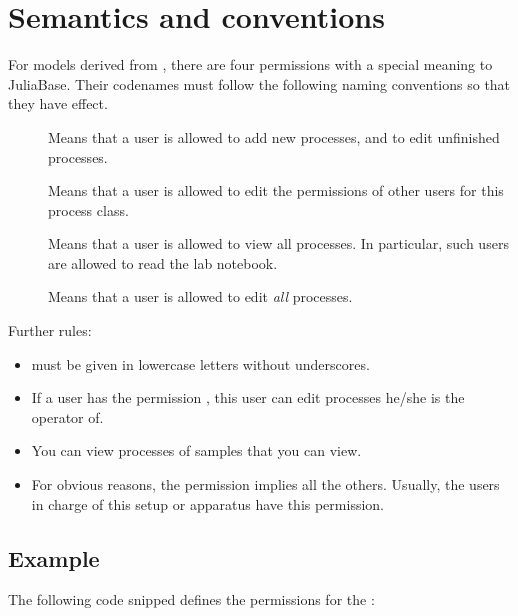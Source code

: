 \documentclass[a4paper,11pt,english]{sphinxmanual}
\begin{document}
\section{Semantics and conventions}
\label{programming/permissions:semantics-and-conventions}
For models derived from , there are
four permissions with a special meaning to JuliaBase.  Their codenames must
follow the following naming conventions so that they have effect.

\begin{description}
\item[{}] \leavevmode
Means that a user is allowed to add new processes, and to edit unfinished
processes.

\item[{}] \leavevmode
Means that a user is allowed to edit the permissions of other users for
this process class.

\item[{}] \leavevmode
Means that a user is allowed to view all processes.  In particular, such
users are allowed to read the lab notebook.

\item[{}] \leavevmode
Means that a user is allowed to edit \emph{all} processes.

\end{description}

Further rules:
\begin{itemize}
\item {} 
 must be given in lowercase letters without underscores.

\item {} 
If a user has the permission , this user can edit
processes he/she is the operator of.

\item {} 
You can view processes of samples that you can view.

\item {} 
For obvious reasons, the  permission
implies all the others.  Usually, the users in charge of this setup or
apparatus have this permission.

\end{itemize}


\subsection{Example}
\label{programming/permissions:example}
The following code snipped defines the permissions for the
:
\end{document}

